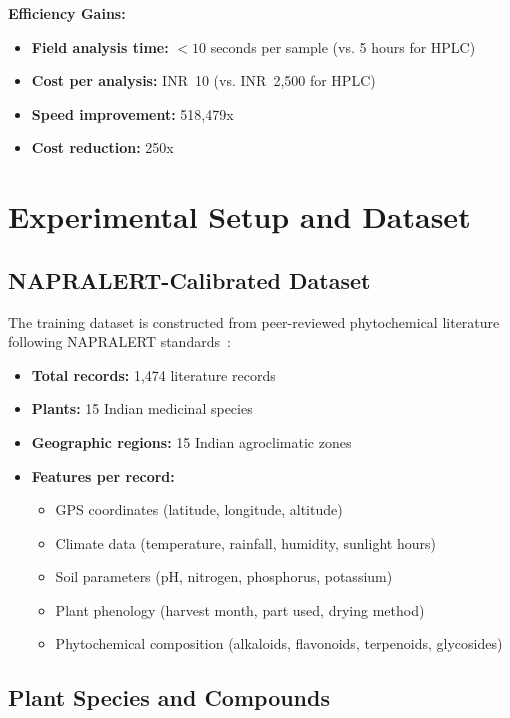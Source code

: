 \documentclass[11pt,a4paper]{article}
\begin{document}
\textbf{Efficiency Gains:}
\begin{itemize}
    \item \textbf{Field analysis time:} $< 10$ seconds per sample (vs. 5 hours for HPLC)
    \item \textbf{Cost per analysis:} INR~10 (vs. INR~2,500 for HPLC)
    \item \textbf{Speed improvement:} 518,479x
    \item \textbf{Cost reduction:} 250x
\end{itemize}

\section{Experimental Setup and Dataset}

\subsection{NAPRALERT-Calibrated Dataset}

The training dataset is constructed from peer-reviewed phytochemical literature following NAPRALERT standards~\cite{samuels2016}:

\begin{itemize}
    \item \textbf{Total records:} 1,474 literature records
    \item \textbf{Plants:} 15 Indian medicinal species
    \item \textbf{Geographic regions:} 15 Indian agroclimatic zones
    \item \textbf{Features per record:} 
    \begin{itemize}
        \item GPS coordinates (latitude, longitude, altitude)
        \item Climate data (temperature, rainfall, humidity, sunlight hours)
        \item Soil parameters (pH, nitrogen, phosphorus, potassium)
        \item Plant phenology (harvest month, part used, drying method)
        \item Phytochemical composition (alkaloids, flavonoids, terpenoids, glycosides)
    \end{itemize}
\end{itemize}

\subsection{Plant Species and Compounds}
\end{document}
